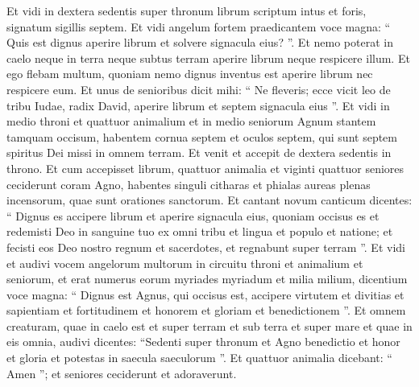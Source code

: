 \begin{biblechapter}
\begin{biblechapter}
\begin{biblechapter}
\begin{biblechapter}
\begin{biblechapter}
\verse Et vidi in dextera sedentis super thronum librum scriptum intus et foris, signatum sigillis septem. 
\verse Et vidi angelum fortem praedicantem voce magna: “ Quis est dignus aperire librum et solvere signacula eius? ”. 
\verse Et nemo poterat in caelo neque in terra neque subtus terram aperire librum neque respicere illum. 
\verse Et ego flebam multum, quoniam nemo dignus inventus est aperire librum nec respicere eum. 
\verse Et unus de senioribus dicit mihi: “ Ne fleveris; ecce vicit leo de tribu Iudae, radix David, aperire librum et septem signacula eius ”.
 \verse Et vidi in medio throni et quattuor animalium et in medio seniorum Agnum stantem tamquam occisum, habentem cornua septem et oculos septem, qui sunt septem spiritus Dei missi in omnem terram. 
\verse Et venit et accepit de dextera sedentis in throno. 
\verse Et cum accepisset librum, quattuor animalia et viginti quattuor seniores ceciderunt coram Agno, habentes singuli citharas et phialas aureas plenas incensorum, quae sunt orationes sanctorum. 
\verse Et cantant novum canticum dicentes:
 “ Dignus es accipere librum
 et aperire signacula eius,
 quoniam occisus es et redemisti Deo in sanguine tuo
 ex omni tribu et lingua et populo et natione;
 \verse et fecisti eos Deo nostro regnum et sacerdotes,
 et regnabunt super terram ”.
 \verse Et vidi et audivi vocem angelorum multorum in circuitu throni et animalium et seniorum, et erat numerus eorum myriades myriadum et milia milium, 
\verse dicentium voce magna:
 “ Dignus est Agnus, qui occisus est, accipere virtutem et divitias et sapientiam
 et fortitudinem et honorem et gloriam et benedictionem ”.
 \verse Et omnem creaturam, quae in caelo est et super terram et sub terra et super mare et quae in eis omnia, audivi dicentes: “Sedenti super thronum et Agno benedictio et honor et gloria et potestas in saecula saeculorum ”.
 \verse Et quattuor animalia dicebant: “ Amen ”; et seniores ceciderunt et adoraverunt.
 

\end{biblechapter}
\end{biblechapter}
\end{biblechapter}
\end{biblechapter}
\end{biblechapter}
